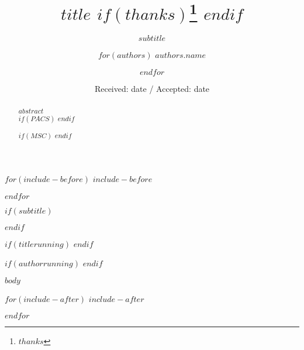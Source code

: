 \documentclass[smallextended]{svjour3}       %
\begin{document}
$for(include-before)$
$include-before$

$endfor$

\title{$title$ $if(thanks)$\thanks{$thanks$} $endif$}
$if(subtitle)$ \subtitle{$subtitle$} $endif$

$if(titlerunning)$
$endif$

\author{ $for(authors)$ $authors.name$ \and $endfor$ }

$if(authorrunning)$
$endif$


\date{Received: date / Accepted: date}


\maketitle

\begin{abstract}
$abstract$
\\
$if(PACS)$
$endif$

$if(MSC)$
$endif$

\end{abstract}


\def\spacingset#1{\renewcommand{\baselinestretch}%
{#1}\small\normalsize} \spacingset{1}


$body$





$for(include-after)$
$include-after$

$endfor$
\end{document}
